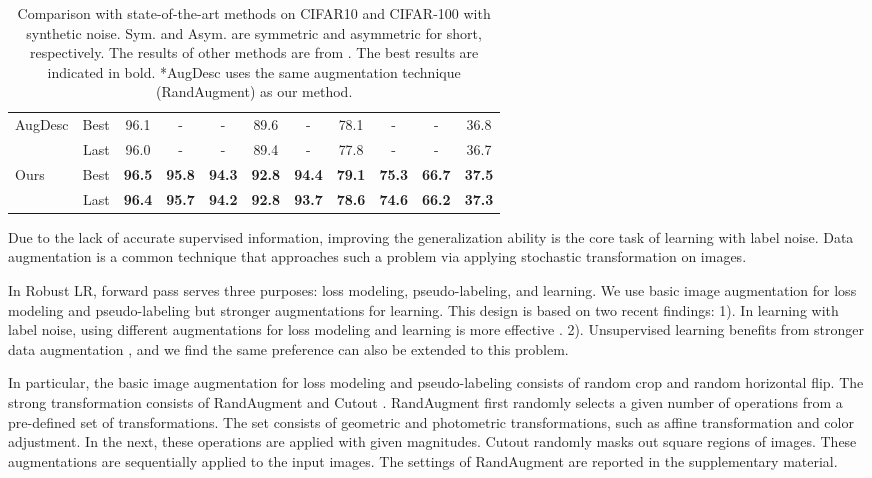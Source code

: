 \documentclass[letterpaper]{article} \usepackage{aaai23}  \usepackage{times}  \usepackage{helvet}  \usepackage{courier}  \usepackage[hyphens]{url}  \usepackage{graphicx} \urlstyle{rm} \def\UrlFont{\rm}  \usepackage{natbib}  \usepackage{caption} \frenchspacing  \setlength{\pdfpagewidth}{8.5in} \setlength{\pdfpageheight}{11in} \usepackage{algorithm}
\begin{document}
\begin{table*}
\begin{tabular}{lr|c|c|c|c|c||c|c|c|c}
		\multirow{2}{*}{AugDesc \cite{nishi2021augmentation}}        & Best  & 96.1 &  -   &   -  & 89.6 &  -   & 78.1 &  -   &  -   & 36.8 \\
				                               & Last  & 96.0 &  -   &   -  & 89.4 &  -   & 77.8 &  -   &  -   & 36.7 \\\midrule
		\multirow{2}{*}{Ours}            & Best & \textbf{96.5} & \textbf{95.8} & \textbf{94.3} & \textbf{92.8} & \textbf{94.4} & \textbf{79.1} & \textbf{75.3} & \textbf{66.7} &  \textbf{37.5} \\
				              & Last & \textbf{96.4} & \textbf{95.7} & \textbf{94.2} & \textbf{92.8} & \textbf{93.7} & \textbf{78.6} & \textbf{74.6} & \textbf{66.2} & \textbf{37.3} \\
        \bottomrule
    \end{tabular}
    \caption{Comparison with state-of-the-art methods on CIFAR10 and CIFAR-100 with synthetic noise. Sym. and Asym. are symmetric and asymmetric for short, respectively. 
    The results of other methods are from \cite{li2020dividemix}.
    The best results are indicated in bold. *AugDesc uses the same augmentation technique (RandAugment) as our method.}
    \label{table_CIFAR}
\end{table*}


Due to the lack of accurate supervised information, improving the generalization ability is the core task of learning with label noise.
Data augmentation is a common technique that approaches such a problem via applying stochastic transformation on images.

In Robust LR, forward pass serves three purposes: loss modeling, pseudo-labeling, and learning.
We use basic image augmentation for loss modeling and pseudo-labeling but stronger augmentations for learning.
This design is based on two recent findings:
1). In learning with label noise, using different augmentations for loss modeling and learning is more effective \cite{nishi2021augmentation}.
2). Unsupervised learning benefits from stronger data augmentation \cite{chen2020simple}, and we find the same preference can also be extended to this problem.

In particular, the basic image augmentation for loss modeling and pseudo-labeling consists of random crop and random horizontal flip.
The strong transformation  consists of RandAugment \cite{cubuk2020randaugment} and Cutout \cite{devries2017improved}. 
RandAugment first randomly selects a given number of operations from a pre-defined set of transformations.
The set consists of geometric and photometric transformations, such as affine transformation and color adjustment. 
In the next, these operations are applied with given magnitudes.
Cutout randomly masks out square regions of images.
These augmentations are sequentially applied to the input images.
The settings of RandAugment are reported in the supplementary material.
\end{document}
